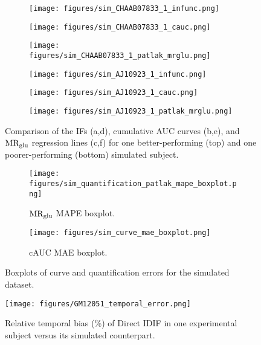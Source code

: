 \begin{figure}[h]
	\centering
	\begin{subfigure}[b]{0.322\textwidth}
		\texttt{[image: figures/sim\_CHAAB07833\_1\_infunc.png]}
		\caption{}
	\end{subfigure}
	\begin{subfigure}[b]{0.322\textwidth}
		\texttt{[image: figures/sim\_CHAAB07833\_1\_cauc.png]}
		\caption{}
	\end{subfigure}
	\begin{subfigure}[b]{0.322\textwidth}
		\texttt{[image: figures/sim\_CHAAB07833\_1\_patlak\_mrglu.png]}
		\caption{}
	\end{subfigure}
	\begin{subfigure}[b]{0.322\textwidth}
		\texttt{[image: figures/sim\_AJ10923\_1\_infunc.png]}
		\caption{}
	\end{subfigure}
	\begin{subfigure}[b]{0.322\textwidth}
		\texttt{[image: figures/sim\_AJ10923\_1\_cauc.png]}
		\caption{}
	\end{subfigure}
	\begin{subfigure}[b]{0.322\textwidth}
		\texttt{[image: figures/sim\_AJ10923\_1\_patlak\_mrglu.png]}
		\caption{}
	\end{subfigure}
	\caption{Comparison of the IFs (a,d), cumulative AUC curves (b,e), and \(\text{MR}_{\text{glu}}\) regression lines (c,f) for one better-performing (top) and one poorer-performing (bottom) simulated subject.}
	\label{fig:sim_ifs}
\end{figure}

\begin{figure}[h]
	\centering
	\begin{subfigure}[b]{0.45\textwidth}
		\texttt{[image: figures/sim\_quantification\_patlak\_mape\_boxplot.png]}
		\caption{\(\text{MR}_{\text{glu}}\) MAPE boxplot.}
		\label{subfig:sim_mape_boxplot}
	\end{subfigure}
	\begin{subfigure}[b]{0.45\textwidth}
		\texttt{[image: figures/sim\_curve\_mae\_boxplot.png]}
		\caption{cAUC MAE boxplot.}
		\label{subfig:sim_cauc_boxplot}
	\end{subfigure}
	\caption{Boxplots of curve and quantification errors for the simulated dataset.}
	\label{fig:sim_boxplots}
\end{figure}

\begin{figure}[h]
	\centering
	\texttt{[image: figures/GM12051\_temporal\_error.png]}
	\caption{Relative temporal bias (\%) of Direct IDIF in one experimental subject versus its simulated counterpart.}
	\label{fig:sim_temporal_err}
\end{figure}



